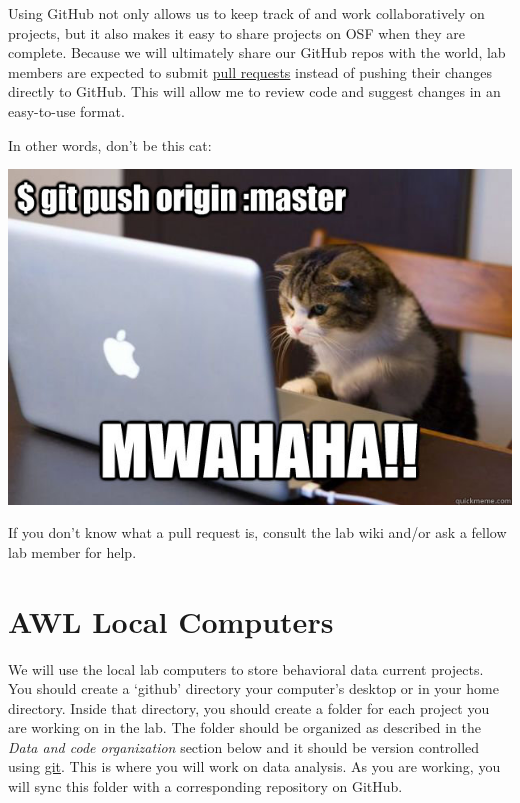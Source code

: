\documentclass[
]{book}
\begin{document}
Using GitHub not only allows us to keep track of and work collaboratively on projects, but it also makes it easy to share projects on OSF when they are complete. Because we will ultimately share our GitHub repos with the world, lab members are expected to submit \href{https://docs.github.com/en/pull-requests/collaborating-with-pull-requests/proposing-changes-to-your-work-with-pull-requests/about-pull-requests}{pull requests} instead of pushing their changes directly to GitHub. This will allow me to review code and suggest changes in an easy-to-use format.

In other words, don't be this cat:

\includegraphics{images/github.png}

If you don't know what a pull request is, consult the lab wiki and/or ask a fellow lab member for help.

\hypertarget{awl-local-computers}{%
\section{AWL Local Computers}\label{awl-local-computers}}

We will use the local lab computers to store behavioral data current projects. You should create a `github' directory your computer's desktop or in your home directory. Inside that directory, you should create a folder for each project you are working on in the lab. The folder should be organized as described in the \emph{Data and code organization} section below and it should be version controlled using \href{https://git-scm.com/}{git}. This is where you will work on data analysis. As you are working, you will sync this folder with a corresponding repository on GitHub.
\end{document}
